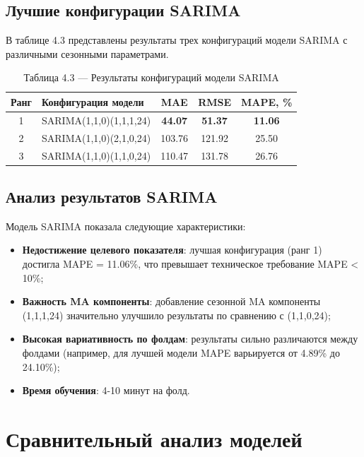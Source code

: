 \subsection{Лучшие конфигурации SARIMA}

\hspace*{1.25cm}В таблице 4.3 представлены результаты трех конфигураций модели SARIMA с различными сезонными параметрами.

\begin{table}[H]
	\centering
	\caption*{Таблица 4.3 --- Результаты конфигураций модели SARIMA}
	\begin{tabular}{|c|p{8cm}|c|c|c|}
		\hline
		\textbf{Ранг} & \textbf{Конфигурация модели} & \textbf{MAE} & \textbf{RMSE} & \textbf{MAPE, \%} \\
		\hline
		1 & SARIMA(1,1,0)(1,1,1,24) & \textbf{44.07} & \textbf{51.37} & \textbf{11.06} \\
		\hline
		2 & SARIMA(1,1,0)(2,1,0,24) & 103.76 & 121.92 & 25.50 \\
		\hline
		3 & SARIMA(1,1,0)(1,1,0,24) & 110.47 & 131.78 & 26.76 \\
		\hline
	\end{tabular}
	\label{tab:sarima_results}
\end{table}

\subsection{Анализ результатов SARIMA}

\hspace*{1.25cm}Модель SARIMA показала следующие характеристики:

\begin{itemize}
	\item \textbf{Недостижение целевого показателя}: лучшая конфигурация (ранг 1) достигла MAPE = 11.06\%, что превышает техническое требование MAPE < 10\%;
	\item \textbf{Важность MA компоненты}: добавление сезонной MA компоненты (1,1,1,24) значительно улучшило результаты по сравнению с (1,1,0,24);
	\item \textbf{Высокая вариативность по фолдам}: результаты сильно различаются между фолдами (например, для лучшей модели MAPE варьируется от 4.89\% до 24.10\%);
	\item \textbf{Время обучения}: 4-10 минут на фолд.
\end{itemize}

\section{Сравнительный анализ моделей}
\label{sec:model_comparison}

